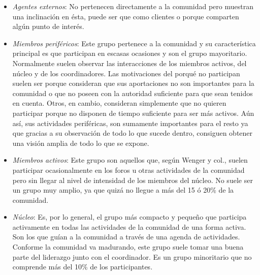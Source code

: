 \begin{itemize}

\item \textit{Agentes externos}: No pertenecen directamente a la comunidad pero muestran una inclinación en ésta, puede ser que como clientes o porque comparten algún punto de interés.

\item \textit{Miembros periféricos}: Este grupo pertenece a la comunidad y su característica principal es que participan en escasas ocasiones y son el grupo mayoritario. Normalmente suelen observar las interacciones de los miembros activos, del núcleo y de los coordinadores. Las motivaciones del porqué no participan suelen ser porque consideran que sus aportaciones no son importantes para la comunidad o que no poseen con la autoridad suficiente para que sean tenidos en cuenta. Otros, en cambio, consideran simplemente que no quieren participar porque no disponen de tiempo suficiente para ser más activos. Aún así, sus actividades periféricas, son sumamente importantes para el resto ya que gracias a su observación de todo lo que sucede dentro, consiguen obtener una visión amplia de todo lo que se expone.

\item \textit{Miembros activos}: Este grupo son aquellos que, según Wenger y col., suelen participar ocasionalmente en los foros u otras actividades de la comunidad pero sin llegar al nivel de intensidad de los miembros del núcleo. No suele ser un grupo muy amplio, ya que quizá no llegue a más del 15 ó 20\% de la comunidad.

\item \textit{Núcleo}: Es, por lo general, el grupo más compacto y pequeño que participa activamente en todas las actividades de la comunidad de una forma activa. Son los que guían a la comunidad a través de una agenda de actividades. Conforme la comunidad va madurando, este grupo suele tomar una buena parte del liderazgo junto con el coordinador. Es un grupo minoritario que no comprende más del 10\% de los participantes.


\end{itemize}
